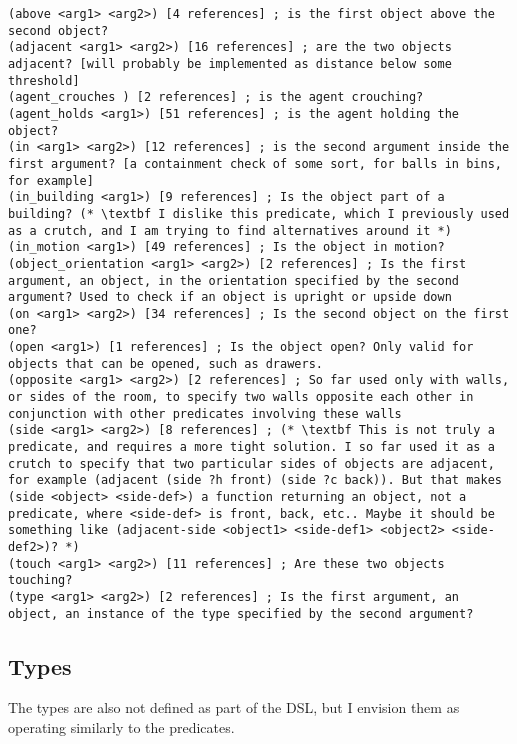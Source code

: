 \documentclass{article}
\begin{document}
\begin{lstlisting}
(above <arg1> <arg2>) [4 references] ; is the first object above the second object?
(adjacent <arg1> <arg2>) [16 references] ; are the two objects adjacent? [will probably be implemented as distance below some threshold]
(agent_crouches ) [2 references] ; is the agent crouching?
(agent_holds <arg1>) [51 references] ; is the agent holding the object?
(in <arg1> <arg2>) [12 references] ; is the second argument inside the first argument? [a containment check of some sort, for balls in bins, for example]
(in_building <arg1>) [9 references] ; Is the object part of a building? (* \textbf I dislike this predicate, which I previously used as a crutch, and I am trying to find alternatives around it *)
(in_motion <arg1>) [49 references] ; Is the object in motion?
(object_orientation <arg1> <arg2>) [2 references] ; Is the first argument, an object, in the orientation specified by the second argument? Used to check if an object is upright or upside down
(on <arg1> <arg2>) [34 references] ; Is the second object on the first one?
(open <arg1>) [1 references] ; Is the object open? Only valid for objects that can be opened, such as drawers.
(opposite <arg1> <arg2>) [2 references] ; So far used only with walls, or sides of the room, to specify two walls opposite each other in conjunction with other predicates involving these walls
(side <arg1> <arg2>) [8 references] ; (* \textbf This is not truly a predicate, and requires a more tight solution. I so far used it as a crutch to specify that two particular sides of objects are adjacent, for example (adjacent (side ?h front) (side ?c back)). But that makes (side <object> <side-def>) a function returning an object, not a predicate, where <side-def> is front, back, etc.. Maybe it should be something like (adjacent-side <object1> <side-def1> <object2> <side-def2>)? *)
(touch <arg1> <arg2>) [11 references] ; Are these two objects touching?
(type <arg1> <arg2>) [2 references] ; Is the first argument, an object, an instance of the type specified by the second argument?
\end{lstlisting}



\subsection{Types}
The types are also not defined as part of the DSL, but I envision them as operating similarly to the predicates. \\
            
\end{document}
